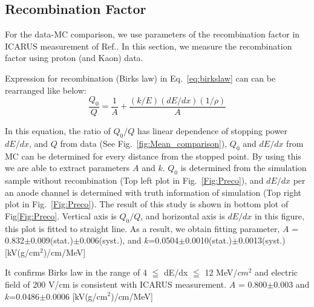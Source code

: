 \subsection{Recombination Factor}

For the data-MC comparison, we use parameters of the recombination factor in ICARUS measurement of Ref.\cite{658352}.
In this section, we measure the recombination factor using proton (and Kaon) data.


  Expression for recombination (Birks law) in Eq.~\ref{eq:birkslaw} can can be rearranged like below:
\begin{equation}
  \frac{Q_{0}}{Q} = \frac{1}{A}+\frac{(k/E)(dE/dx)(1/\rho)}{A}
\end{equation}

In this equation, the ratio of $Q_{0}/Q$ has linear dependence of stopping power $dE/dx$,
and $Q$ from data (See Fig.~\ref{fig:Mean_comparison}), $Q_{0}$ and $dE/dx$ from MC can be determined for every distance from the stopped point.
By using this we are able to extract parameters $A$ and $k$.
$Q_{0}$ is determined from the simulation sample without recombination (Top left plot in Fig.~\ref{Fig:Preco}), and $dE/dx$ per an anode channel is determined with truth information of simulation (Top right plot in Fig.~\ref{Fig:Preco}). 
The result of this study is shown in bottom plot of Fig\ref{Fig:Preco}. Vertical axis is $Q_{0}/Q$, and horizontal axis is $dE/dx$ in this figure, this plot is fitted to straight line.
As a result, we obtain fitting parameter, $A$ = 0.832$\pm$0.009(stat.)$\pm$0.006(syst.), and $k$=0.0504$\pm$0.0010(stat.)$\pm$0.0013(syst.) [kV(g/cm$^{2}$)/cm/MeV]

It confirms Birks law in the range of 4  $\leqq$ dE/dx $\leqq$ 12 MeV/$cm^2$ and electric field of 200 V/cm is consistent with ICARUS measurement\cite{658352}.
 $A$ = 0.800$\pm$0.003 and $k$=0.0486$\pm$0.0006 [kV(g/cm$^{2}$)/cm/MeV]

